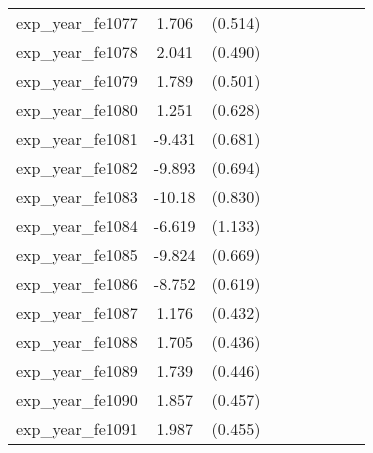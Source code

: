 {\begin{tabular}{l*{4}{cc}}
exp\_year\_fe1077&    1.706\sym{***}&  (0.514)&                  &         &                  &         &                  &         \\
exp\_year\_fe1078&    2.041\sym{***}&  (0.490)&                  &         &                  &         &                  &         \\
exp\_year\_fe1079&    1.789\sym{***}&  (0.501)&                  &         &                  &         &                  &         \\
exp\_year\_fe1080&    1.251\sym{*}  &  (0.628)&                  &         &                  &         &                  &         \\
exp\_year\_fe1081&   -9.431\sym{***}&  (0.681)&                  &         &                  &         &                  &         \\
exp\_year\_fe1082&   -9.893\sym{***}&  (0.694)&                  &         &                  &         &                  &         \\
exp\_year\_fe1083&   -10.18\sym{***}&  (0.830)&                  &         &                  &         &                  &         \\
exp\_year\_fe1084&   -6.619\sym{***}&  (1.133)&                  &         &                  &         &                  &         \\
exp\_year\_fe1085&   -9.824\sym{***}&  (0.669)&                  &         &                  &         &                  &         \\
exp\_year\_fe1086&   -8.752\sym{***}&  (0.619)&                  &         &                  &         &                  &         \\
exp\_year\_fe1087&    1.176\sym{**} &  (0.432)&                  &         &                  &         &                  &         \\
exp\_year\_fe1088&    1.705\sym{***}&  (0.436)&                  &         &                  &         &                  &         \\
exp\_year\_fe1089&    1.739\sym{***}&  (0.446)&                  &         &                  &         &                  &         \\
exp\_year\_fe1090&    1.857\sym{***}&  (0.457)&                  &         &                  &         &                  &         \\
exp\_year\_fe1091&    1.987\sym{***}&  (0.455)&                  &         &                  &         &                  &         \\

\end{tabular}}
